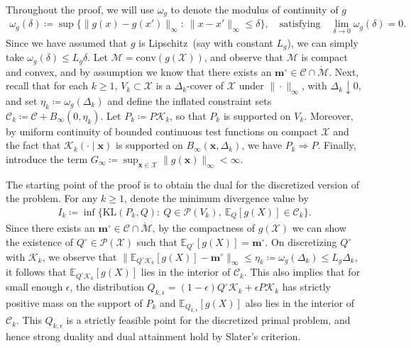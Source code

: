 \documentclass{article}
\theoremstyle{plain}
\theoremstyle{definition}
\newcommand{\calP}{\mathcal P}
\newcommand{\calC}{\mathcal C}
\newcommand{\calX}{\mathcal X}
\newcommand{\calK}{\mathcal{K}}
\newcommand{\calM}{\mathcal M}
\newcommand{\mvec}{\mathbf{m}}
\newcommand{\xvec}{\mathbf{x}}
\newcommand{\qtext}[1]{\quad \text{#1} \quad}
\begin{document}
Throughout the proof, we will use $\omega_g$ to denote the modulus of continuity of $g$
\begin{align}
\omega_g(\delta)\coloneqq \sup\{\|g(x)-g(x')\|_\infty:\ \|x-x'\|_\infty\le \delta\}, \qtext{satisfying} \lim_{\delta \to 0} \omega_g(\delta)=0. 
\end{align}
Since we have assumed that $g$ is Lipschitz~(say with constant $L_g$), we can simply take $\omega_g(\delta) \leq L_g  \delta$. 
Let $\mathcal M=\mathrm{conv}(g(\mathcal X))$, and observe that $\mathcal M$ is compact and convex, and by assumption we know that  there exists an $\mvec^\circ\in \calC \cap \mathring{\calM}$.
Next, recall that for each $k\ge 1$, $V_k\subset \calX$ is a $\Delta_k$-cover of $\calX$ under $\|\cdot\|_\infty$,
with $\Delta_k\downarrow 0$, and set $\eta_k\coloneqq \omega_g(\Delta_k)$ and define the inflated constraint sets
$\calC_k\coloneqq \calC+B_\infty(0,\eta_k)$. Let $P_k \coloneqq P\mathcal K_k$, so that $P_k$ is supported on $V_k$. Moreover, by uniform continuity of bounded continuous test functions on compact $\mathcal X$ and the fact that $\calK_k(\cdot\mid \xvec)$ is supported on $B_\infty(\xvec,\Delta_k)$, we have $P_k\Longrightarrow P$. Finally, introduce the term $G_\infty\coloneqq \sup_{\xvec\in\mathcal X}\|g(\xvec)\|_\infty<\infty$.

The starting point of the proof is to obtain the dual for the discretized version of the problem. For any $k\ge 1$, denote the
minimum divergence value by
\begin{align}
I_k \coloneqq  \inf\Big\{\mathrm{KL}(P_k,Q):\ Q\in\mathcal P(V_k),\ \mathbb E_Q[g(X)]\in \calC_k\Big\}.
\end{align}
Since there exists an $\mvec^\circ \in \calC \cap \mathring{\calM}$, by the compactness of $g(\calX)$ we can show the existence of $Q^\circ \in \calP(\calX)$ such that $\mathbb{E}_{Q^\circ}[g(X)] = \mvec^\circ$. On discretizing $Q^\circ$ with $\calK_k$, we observe that $\|\mathbb{E}_{Q^\circ \calK_k}[g(X)] - \mvec^\circ\|_\infty \leq \eta_k \coloneqq \omega_g(\Delta_k) \leq L_g \Delta_k$, it follows that  $\mathbb{E}_{Q^\circ \calK_k}[g(X)]$ lies in the interior of $\calC_k$. This also implies that for small enough $\epsilon$, the distribution $Q_{k, \epsilon} = (1-\epsilon) Q^\circ \calK_k + \epsilon P \calK_k$ has strictly positive mass on the support of $P_k$ and $\mathbb{E}_{Q_{k,\epsilon}}[g(X)]$ also lies in the interior of $\calC_k$. This $Q_{k,\epsilon}$ is a strictly feasible point for the discretized primal problem, and hence strong duality and dual attainment hold  by Slater's criterion.
\end{document}
